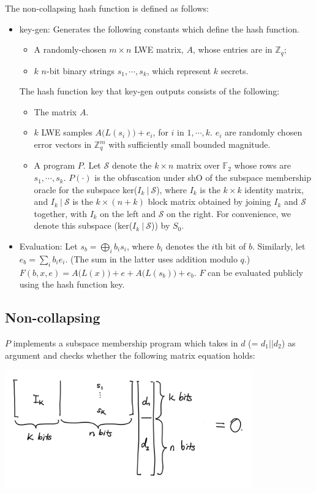 \documentclass{article}
\begin{document}
The non-collapsing hash function is defined as follows:
\begin{itemize}
    \item \textsf{key-gen}: Generates the following constants which define the hash function.
    \begin{itemize}
        \item A randomly-chosen $m \times n$ LWE matrix, $A$, whose entries are in $\mathbb{Z}_q$;
        \item $k$ $n$-bit binary strings $s_1, \cdots, s_k$, which represent $k$ secrets.
    \end{itemize}
    The hash function key that \textsf{key-gen} outputs consists of the following:
    \begin{itemize}
			\item The matrix $A$.
			\item $k$ LWE samples $A\big( L(s_i) \big) + e_i$, for $i$ in $1, \cdots, k$. $e_i$ are randomly chosen error vectors in $\mathbb{Z}_q^m$ with sufficiently small bounded magnitude.
        \item A program $P$. Let $\mathcal{S}$ denote the $k \times n$ matrix over $\mathbb{F}_2$ whose rows are $s_1, \cdots, s_k$. $P(\cdot)$ is the obfuscation under \textsf{shO} of the subspace membership oracle for the subspace ker($I_k \: | \: \mathcal{S}$), where $I_k$ is the $k \times k$ identity matrix, and $I_k \: | \: \mathcal{S}$ is the $k \times (n+k)$ block matrix obtained by joining $I_k$ and $\mathcal{S}$ together, with $I_k$ on the left and $\mathcal{S}$ on the right. For convenience, we denote this subspace (ker($I_k \: | \: \mathcal{S}$)) by $S_0$.
    \end{itemize}
    \item Evaluation: Let $s_b = \bigoplus_i b_i s_i$, where $b_i$ denotes the $i$th bit of $b$. Similarly, let $e_b = \sum_i b_i e_i$. (The sum in the latter uses addition modulo $q$.) $F(b, x, e) = A\big( L(x) \big) + e + A\big( L(s_b) \big) + e_b$. $F$ can be evaluated publicly using the hash function key.
\end{itemize}

\subsection{Non-collapsing}
$P$ implements a subspace membership program which takes in $d$ (= $d_1 || d_2$) as argument and checks whether the following matrix equation holds:
\begin{center}
\includegraphics[width=0.8\textwidth]{Diagrams/1.png}
\end{center}
\end{document}
